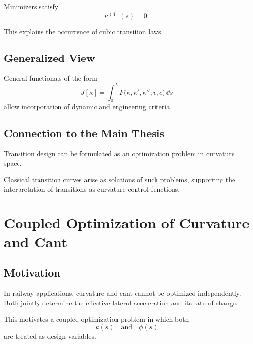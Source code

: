 \begin{proposition}
Minimizers satisfy
\[
\kappa^{(4)}(s)=0.
\]
\end{proposition}

\begin{remark}
This explains the occurrence of cubic transition laws.
\end{remark}

\subsection{Generalized View}

\begin{remark}
General functionals of the form
\[
J[\kappa]
=
\int_0^L
F\bigl(\kappa,\kappa',\kappa'';v,c\bigr)\,\dd s
\]
allow incorporation of dynamic and engineering criteria.
\end{remark}

\subsection{Connection to the Main Thesis}

\begin{summary}
Transition design can be formulated as an optimization problem in
curvature space.

Classical transition curves arise as solutions of such problems,
supporting the interpretation of transitions as curvature control
functions.
\end{summary}

\section{Coupled Optimization of Curvature and Cant}

\subsection{Motivation}

\begin{remark}
In railway applications, curvature and cant cannot be optimized
independently.
Both jointly determine the effective lateral acceleration and its rate
of change.
\end{remark}

\begin{remark}
This motivates a coupled optimization problem in which both
\[
\kappa(s)
\quad \text{and} \quad
\phi(s)
\]
are treated as design variables.
\end{remark}

